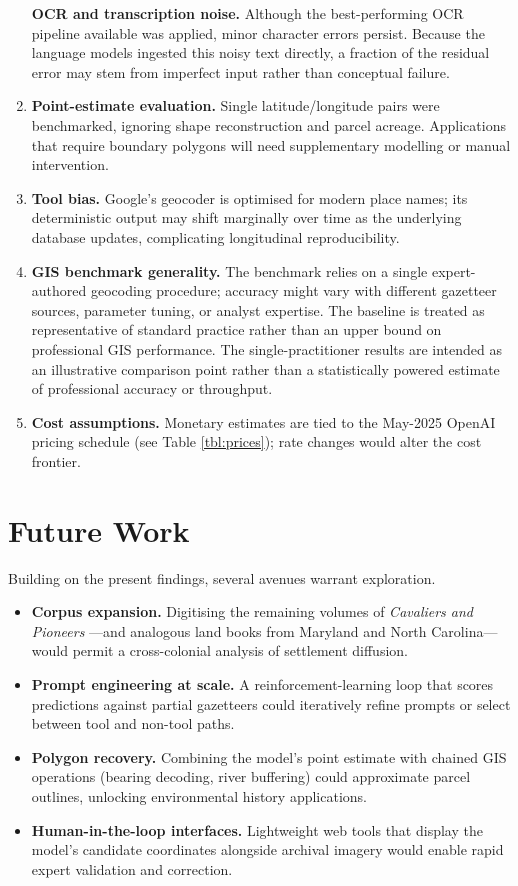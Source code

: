 \begin{enumerate}
  \textbf{OCR and transcription noise.} Although the best-performing OCR
  pipeline available was applied, minor character errors persist.
  Because the language models ingested this noisy text directly, a
  fraction of the residual error may stem from imperfect input rather
  than conceptual failure.
\item
  \textbf{Point-estimate evaluation.} Single latitude/longitude pairs
  were benchmarked, ignoring shape reconstruction and parcel acreage.
  Applications that require boundary polygons will need supplementary
  modelling or manual intervention.
\item
  \textbf{Tool bias.} Google's geocoder is optimised for modern place
  names; its deterministic output may shift marginally over time as the
  underlying database updates, complicating longitudinal
  reproducibility.
\item
  \textbf{GIS benchmark generality.} The benchmark
  \citep{Bashorun2025_gis} relies on a single expert-authored geocoding
  procedure; accuracy might vary with different gazetteer sources,
  parameter tuning, or analyst expertise. The baseline is treated as
  representative of standard practice rather than an upper bound on
  professional GIS performance. The single-practitioner results are
  intended as an illustrative comparison point rather than a
  statistically powered estimate of professional accuracy or throughput.
\item
  \textbf{Cost assumptions.} Monetary estimates are tied to the May-2025
  OpenAI pricing schedule (see Table \ref{tbl:prices}); rate changes
  would alter the cost frontier.
\end{enumerate}

\section{Future Work}\label{future-work}

Building on the present findings, several avenues warrant exploration.

\begin{itemize}
\tightlist
\item
  \textbf{Corpus expansion.} Digitising the remaining volumes of
  \emph{Cavaliers and Pioneers} \citep{Nugent1979_cavaliers3}---and
  analogous land books from Maryland and North Carolina---would permit a
  cross-colonial analysis of settlement diffusion.
\item
  \textbf{Prompt engineering at scale.} A reinforcement-learning loop
  that scores predictions against partial gazetteers could iteratively
  refine prompts or select between tool and non-tool paths.
\item
  \textbf{Polygon recovery.} Combining the model's point estimate with
  chained GIS operations (bearing decoding, river buffering) could
  approximate parcel outlines, unlocking environmental history
  applications.
\item
  \textbf{Human-in-the-loop interfaces.} Lightweight web tools that
  display the model's candidate coordinates alongside archival imagery
  would enable rapid expert validation and correction.
\end{itemize}

